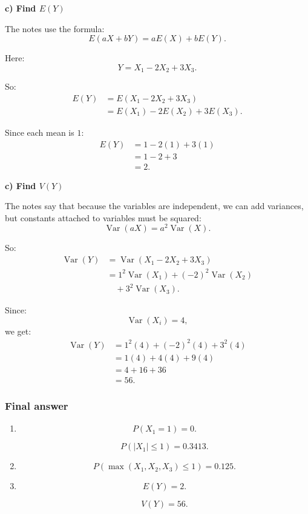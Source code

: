 \documentclass[10pt]{article}
\begin{document}
\textbf{c) Find \(E(Y)\)}

The notes use the formula:
\[
E(aX+bY)=aE(X)+bE(Y).
\]

Here:
\[
Y=X_1-2X_2+3X_3.
\]

So:
\begin{align*}
E(Y)
&=
E(X_1-2X_2+3X_3)
\\[2mm]
&=
E(X_1)-2E(X_2)+3E(X_3).
\end{align*}

Since each mean is \(1\):
\begin{align*}
E(Y)
&=
1-2(1)+3(1)
\\[2mm]
&=
1-2+3
\\[2mm]
&=
2.
\end{align*}

\textbf{c) Find \(V(Y)\)}

The notes say that because the variables are
independent, we can add variances, but constants
attached to variables must be squared:
\[
\operatorname{Var}(aX)=a^2\operatorname{Var}(X).
\]

So:
\begin{align*}
\operatorname{Var}(Y)
&=
\operatorname{Var}(X_1-2X_2+3X_3)
\\[2mm]
&=
1^2\operatorname{Var}(X_1)
+(-2)^2\operatorname{Var}(X_2)
\\
&\quad
+3^2\operatorname{Var}(X_3).
\end{align*}

Since:
\[
\operatorname{Var}(X_i)=4,
\]
we get:
\begin{align*}
\operatorname{Var}(Y)
&=
1^2(4)+(-2)^2(4)+3^2(4)
\\[2mm]
&=
1(4)+4(4)+9(4)
\\[2mm]
&=
4+16+36
\\[2mm]
&=
56.
\end{align*}

\subsubsection*{Final answer}

\begin{enumerate}[label=\alph*)]
\item
\[
P(X_1=1)=0.
\]

\[
P(|X_1|\le 1)=0.3413.
\]

\item
\[
P(\max(X_1,X_2,X_3)\le 1)
=0.125.
\]

\item
\[
E(Y)=2.
\]

\[
V(Y)=56.
\]
\end{enumerate}
\end{document}
